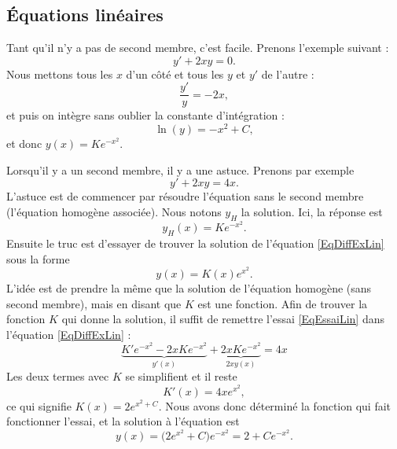 					\subsection{Équations linéaires}

Tant qu'il n'y a pas de second membre, c'est facile. Prenons l'exemple suivant :
\begin{equation}
	y'+2xy=0.
\end{equation}
Nous mettons tous les $x$ d'un côté et tous les $y$ et $y'$ de l'autre :
\begin{equation}
	\frac{ y' }{ y }=-2x,
\end{equation}
et puis on intègre sans oublier la constante d'intégration :
\begin{equation}
	\ln(y)=-x^2+C,
\end{equation}
et donc $y(x)=K e^{-x^2}$.

Lorsqu'il y a un second membre, il y a une astuce. Prenons par exemple
\begin{equation}		\label{EqDiffExLin}
	y'+2xy=4x.
\end{equation}
L'astuce est de commencer par résoudre l'équation sans le second membre (l'équation homogène associée). Nous notons $y_H$ la solution. Ici, la réponse est
\begin{equation}
	y_H(x)=K e^{-x^2}.
\end{equation}
Ensuite le truc est d'essayer de trouver la solution de l'équation \eqref{EqDiffExLin} sous la forme
\begin{equation}		\label{EqEssaiLin}
	y(x)=K(x) e^{x^2}.
\end{equation}
L'idée est de prendre la même que la solution de l'équation homogène (sans second membre), mais en disant que $K$ est une fonction. Afin de trouver la fonction $K$ qui donne la solution, il suffit de remettre l'essai \eqref{EqEssaiLin} dans l'équation \eqref{EqDiffExLin} :
\begin{equation}
	\underbrace{K' e^{-x^2}-2xK e^{-x^2}}_{y'(x)}+\underbrace{2xK e^{-x^2}}_{2xy(x)}=4x
\end{equation}
Les deux termes avec $K$ se simplifient et il reste
\begin{equation}
	K'(x)=4x e^{x^2},
\end{equation}
ce qui signifie $K(x)=2 e^{x^2+C}$. Nous avons donc déterminé la fonction qui fait fonctionner l'essai, et la solution à l'équation est
\begin{equation}
	y(x)=\big( 2 e^{x^2}+C \big) e^{-x^2}=2+C e^{-x^2}.
\end{equation}

